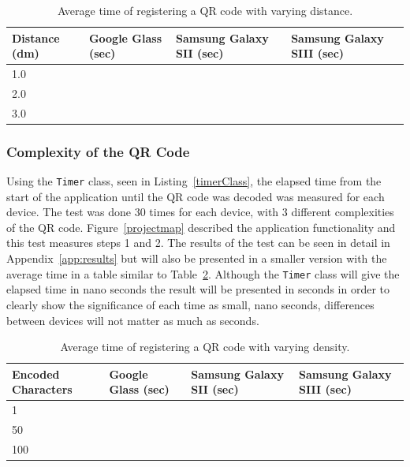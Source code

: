 	\begin{table}[ht!]
    		\caption{Average time of registering a QR code with varying distance.} \label{tab:distanceAverage}
		\centering \begin{tabularx}{\textwidth}{l|X|X|X} \hline
		\textbf{Distance (dm)} & \textbf{Google Glass (sec)} & \textbf{Samsung Galaxy SII (sec)} & \textbf{Samsung Galaxy SIII (sec)} \\ \hline \hline
       
		1.0	&	&	&	\\ \hline
		2.0	&	&	&	\\ \hline
		3.0	&	&	&	\\ \hline
		
		\end{tabularx}
	\end{table}

\subsubsection{Complexity of the QR Code}

Using the \texttt{Timer} class, seen in Listing~\ref{timerClass}, the elapsed time from the start of the application until the QR code was decoded was measured for each device. The test was done 30 times for each device, with 3 different complexities of the QR code. Figure~\ref{projectmap} described the application functionality and this test measures steps 1 and 2. The results of the test can be seen in detail in Appendix~\ref{app:results} but will also be presented in a smaller version with the average time in a table similar to Table~\ref{tab:complexityAverage}. Although the \texttt{Timer} class will give the elapsed time in nano seconds the result will be presented in seconds in order to clearly show the significance of each time as small, nano seconds, differences between devices will not matter as much as seconds.


	\begin{table}[H]%
    		\caption{Average time of registering a QR code with varying density.} \label{tab:complexityAverage}
		\centering \begin{tabularx}{\textwidth}{l|X|X|X} \hline
		\textbf{Encoded Characters} & \textbf{Google Glass (sec)} & \textbf{Samsung Galaxy SII (sec)} & \textbf{Samsung Galaxy SIII (sec)} \\ \hline \hline
       
		1	&	&	&	\\ \hline
		50	&	&	&	\\ \hline
		100	&	&	&	\\ \hline
		
		\end{tabularx}
	\end{table}

